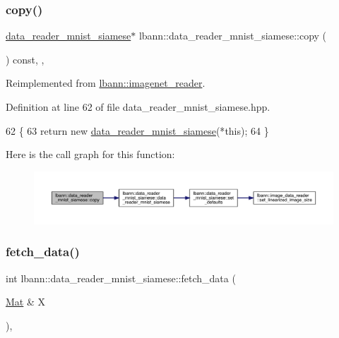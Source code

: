 \subsubsection{\texorpdfstring{copy()}{copy()}}
{\footnotesize\ttfamily \hyperlink{classlbann_1_1data__reader__mnist__siamese}{data\+\_\+reader\+\_\+mnist\+\_\+siamese}$\ast$ lbann\+::data\+\_\+reader\+\_\+mnist\+\_\+siamese\+::copy (\begin{DoxyParamCaption}{ }\end{DoxyParamCaption}) const\hspace{0.3cm}{\ttfamily [inline]}, {\ttfamily [override]}, {\ttfamily [virtual]}}



Reimplemented from \hyperlink{classlbann_1_1imagenet__reader_a71be5220be24de5caf00d2e422b750f2}{lbann\+::imagenet\+\_\+reader}.



Definition at line 62 of file data\+\_\+reader\+\_\+mnist\+\_\+siamese.\+hpp.


\begin{DoxyCode}
62                                                    \{
63     \textcolor{keywordflow}{return} \textcolor{keyword}{new} \hyperlink{classlbann_1_1data__reader__mnist__siamese_af10a15ece71ae9c20069161a1c83abcd}{data\_reader\_mnist\_siamese}(*\textcolor{keyword}{this});
64   \}
\end{DoxyCode}
Here is the call graph for this function\+:\nopagebreak
\begin{figure}[H]
\begin{center}
\leavevmode
\includegraphics[width=350pt]{classlbann_1_1data__reader__mnist__siamese_a0b9750c72f9fdb28499b6dfe70bc9a6f_cgraph}
\end{center}
\end{figure}
\mbox{\label{classlbann_1_1data__reader__mnist__siamese_ac44a7118e94338e14f7b6a9e33239155}} 
\subsubsection{\texorpdfstring{fetch\+\_\+data()}{fetch\_data()}}
{\footnotesize\ttfamily int lbann\+::data\+\_\+reader\+\_\+mnist\+\_\+siamese\+::fetch\+\_\+data (\begin{DoxyParamCaption}\item[{\hyperlink{base_8hpp_a68f11fdc31b62516cb310831bbe54d73}{Mat} \&}]{X }\end{DoxyParamCaption})\hspace{0.3cm}{\ttfamily [override]}, {\ttfamily [virtual]}}




